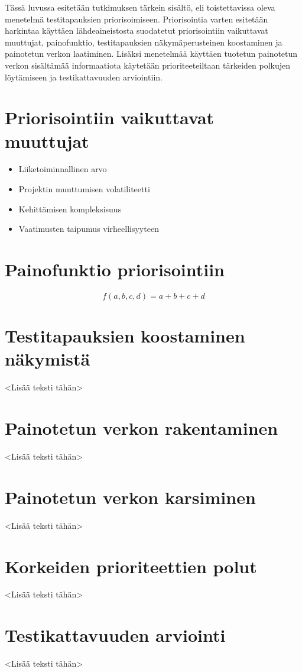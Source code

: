 Tässä luvussa esitetään tutkimuksen tärkein sisältö, eli toistettavissa oleva menetelmä testitapauksien priorisoimiseen.
Priorisointia varten esitetään harkintaa käyttäen lähdeaineistosta suodatetut priorisointiin vaikuttavat muuttujat, painofunktio, testitapauksien näkymäperusteinen koostaminen ja painotetun verkon laatiminen.
Lisäksi menetelmää käyttäen tuotetun painotetun verkon sisältämää informaatiota käytetään prioriteeteiltaan tärkeiden polkujen löytämiseen ja testikattavuuden arviointiin.

\section{Priorisointiin vaikuttavat muuttujat}

\begin{itemize}
  \item Liiketoiminnallinen arvo
  \item Projektin muuttumisen volatiliteetti
  \item Kehittämisen kompleksisuus
  \item Vaatimusten taipumus virheellisyyteen
\end{itemize}

\section{Painofunktio priorisointiin}

\[f(a,b,c,d) = a+b+c+d\]

\section{Testitapauksien koostaminen näkymistä}

<Lisää teksti tähän>

\section{Painotetun verkon rakentaminen}

<Lisää teksti tähän>

\section{Painotetun verkon karsiminen}

<Lisää teksti tähän>

\section{Korkeiden prioriteettien polut}

<Lisää teksti tähän>

\section{Testikattavuuden arviointi}

<Lisää teksti tähän>

